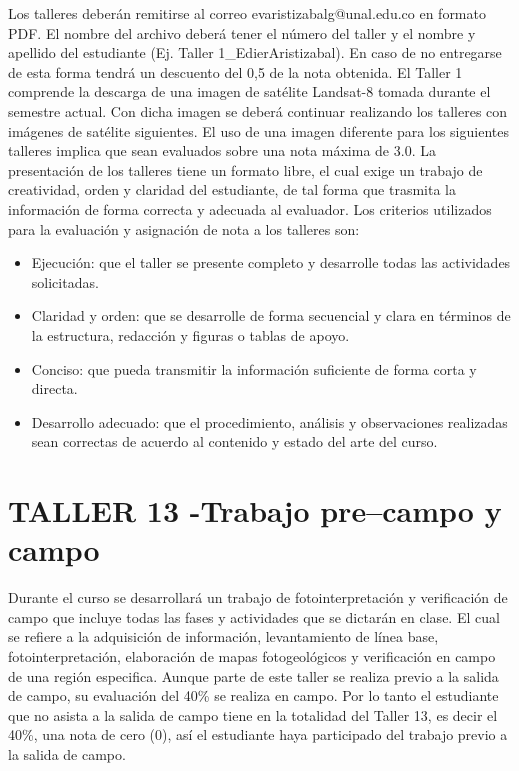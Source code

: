 \documentclass[a4paper,twoside,11pt,]{article}
\begin{document}
Los talleres deberán remitirse al correo evaristizabalg@unal.edu.co en formato PDF. El nombre del archivo deberá tener el número del taller y el nombre y apellido del estudiante (Ej. Taller 1\_EdierAristizabal). En caso de no entregarse de esta forma tendrá un descuento del 0,5 de la nota obtenida.
El Taller 1 comprende la descarga de una imagen de satélite Landsat-8 tomada durante el semestre actual. Con dicha imagen se deberá continuar realizando los talleres con imágenes de satélite siguientes. El uso de una imagen diferente para los siguientes talleres implica que sean evaluados sobre una nota máxima de 3.0.
La presentación de los talleres tiene un formato libre, el cual exige un trabajo de creatividad, orden y claridad del estudiante, de tal forma que trasmita la información de forma correcta y adecuada al evaluador. Los criterios utilizados para la evaluación y asignación de nota a los talleres son:
\begin{itemize}
\item Ejecución: que el taller se presente completo y desarrolle todas las actividades solicitadas.
\item Claridad y orden: que se desarrolle de forma secuencial y clara en términos de la estructura, redacción y figuras o tablas de apoyo.
\item Conciso: que pueda transmitir la información suficiente de forma corta y directa.
\item Desarrollo adecuado: que el procedimiento, análisis y observaciones realizadas sean correctas de acuerdo al contenido y estado del arte del curso.
\end{itemize}

\section{TALLER 13 -Trabajo pre--campo y  campo}
Durante el curso se desarrollará un trabajo de fotointerpretación y verificación de campo que incluye todas las fases y actividades que se dictarán en clase. El cual se refiere a la adquisición de información, levantamiento de línea base, fotointerpretación, elaboración de mapas fotogeológicos y verificación en campo de una región especifica.
Aunque parte de este taller se realiza previo a la salida de campo, su evaluación del 40\% se realiza en campo. Por lo tanto el estudiante que no asista a la salida de campo tiene en la totalidad del Taller 13, es decir el 40\%, una nota de cero (0), así el estudiante haya participado del trabajo previo a la salida de campo.
\end{document}
